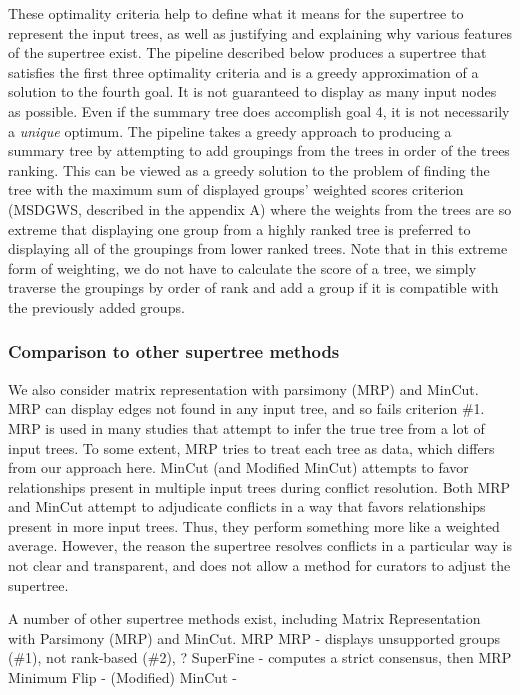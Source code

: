 \documentclass[fleqn,12pt,lineno,english]{wlpeerj}
\begin{document}
These optimality criteria help to define what it means for the supertree
to represent the input trees, as well as justifying and explaining
why various features of the supertree exist. The pipeline described
below produces a supertree that satisfies the first three optimality
criteria and is a greedy approximation of a solution to the fourth
goal. It is not guaranteed to display as many input nodes as possible.
Even if the summary tree does accomplish goal 4, it is not necessarily
a \emph{unique} optimum. The pipeline takes a greedy approach to producing
a summary tree by attempting to add groupings from the trees in order
of the trees ranking. This can be viewed as a greedy solution to the
problem of finding the tree with the maximum sum of displayed groups'
weighted scores criterion (MSDGWS, described in the appendix A) where the
weights from the trees are so extreme that displaying one group from
a highly ranked tree is preferred to displaying all of the groupings
from lower ranked trees.
Note that in this extreme form of weighting, we do not have to calculate
the score of a tree, we simply traverse the groupings by order of rank
and add a group if it is compatible with the previously added groups.

\subsubsection{Comparison to other supertree methods}

We also consider matrix representation with parsimony (MRP) and MinCut.
MRP can display edges not found
in any input tree, and so fails criterion \#1.  MRP is used in many
studies that attempt to infer the true tree from a lot of input
trees.  To some extent, MRP tries to treat each tree as data, which
differs from our approach here.
MinCut (and Modified MinCut) attempts to favor relationships present
in multiple input trees during conflict resolution.
Both MRP and MinCut attempt to adjudicate conflicts in a way that
favors relationships present in more input trees.  Thus, they perform
something more like a weighted average.  However, the reason the
supertree resolves conflicts in a particular way is not clear and
transparent, and does not allow a method for curators to adjust the
supertree.

A number of other supertree methods exist, including Matrix
Representation with Parsimony (MRP) and MinCut.  MRP
MRP - displays unsupported groups (\#1), not rank-based (\#2), ?
SuperFine - computes a strict consensus, then MRP
Minimum Flip - 
(Modified) MinCut - 
\end{document}
